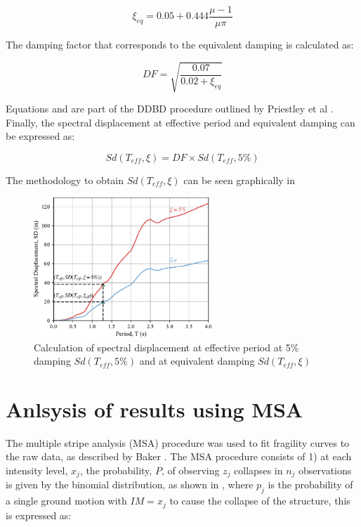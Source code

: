 \begin{equation}
    \xi_{eq}=0.05+0.444\frac{\mu-1}{\mu\pi}
    \label{eq:EqDamping_calcualtion}
\end{equation}

The damping factor that corresponds to the equivalent damping is calculated as:

\begin{equation}
    DF=\sqrt{\frac{0.07}{0.02+\xi_{eq}}}
    \label{eq:DF_calcualtion}
\end{equation}

Equations  and  are part of the DDBD procedure outlined by Priestley et al \cite{Priestley2007}. Finally, the spectral displacement at effective period and equivalent damping can be expressed as:


\begin{equation}
    Sd(T_{eff},\xi)=DF \times Sd(T_{eff},5\%)
    \label{eq:Sd_teff_xi_calcualtion}
\end{equation}

The methodology to obtain $Sd(T_{eff},\xi)$  can be seen graphically in 

\begin{figure}[htbp]
	\centering
	\includegraphics[width=0.6\textwidth]{VAC Thesis 2.0/Chapter-5/figs/SpectralDisplacement_SD(Teff,xi)_Calc.pdf}
	\caption{Calculation of spectral displacement at effective period at 5\% damping $Sd(T_{eff},5\%)$ and at equivalent damping $Sd(T_{eff},\xi)$}
	\label{fig:SpectralDisplacementCalculation}
\end{figure}

\section{Anlsysis of results using MSA}

The multiple stripe analysis (MSA) procedure was used to fit fragility curves to the raw data, as described by Baker \cite{Baker2015}. The MSA procedure consists of 1) at each intensity level, $x_j$, the probability, $P$, of observing $z_j$ collapses in $n_j$ observations is given by the binomial distribution, as shown in , where $p_j$ is the probability of a single ground motion with $IM = x_j$ to cause the collapse of the structure, this is expressed as:

